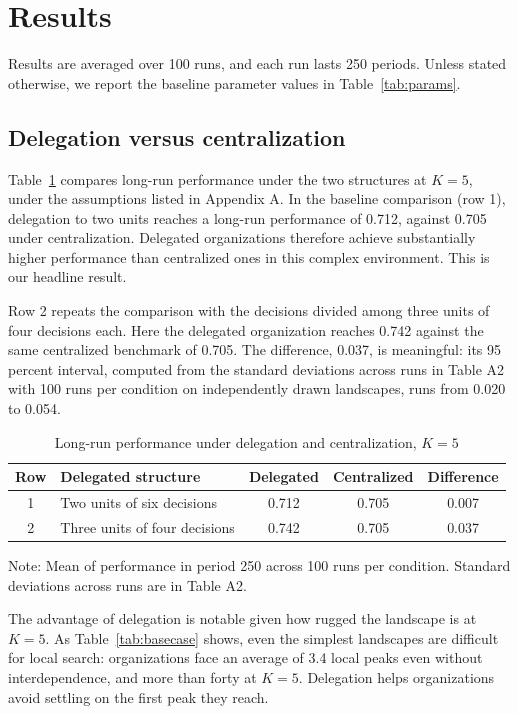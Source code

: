 \documentclass[11pt]{article}
\begin{document}
\section{Results}

Results are averaged over 100 runs, and each run lasts 250 periods. Unless stated otherwise, we report the baseline parameter values in Table~\ref{tab:params}.

\subsection{Delegation versus centralization}

Table~\ref{tab:main} compares long-run performance under the two structures at $K = 5$, under the assumptions listed in Appendix A. In the baseline comparison (row 1), delegation to two units reaches a long-run performance of 0.712, against 0.705 under centralization. Delegated organizations therefore achieve substantially higher performance than centralized ones in this complex environment. This is our headline result.

Row 2 repeats the comparison with the decisions divided among three units of four decisions each. Here the delegated organization reaches 0.742 against the same centralized benchmark of 0.705. The difference, 0.037, is meaningful: its 95 percent interval, computed from the standard deviations across runs in Table A2 with 100 runs per condition on independently drawn landscapes, runs from 0.020 to 0.054.

\begin{table}[h]
\centering
\caption{Long-run performance under delegation and centralization, $K = 5$}
\label{tab:main}
\begin{tabular}{clccc}
\toprule
Row & Delegated structure & Delegated & Centralized & Difference \\
\midrule
1 & Two units of six decisions & 0.712 & 0.705 & 0.007 \\
2 & Three units of four decisions & 0.742 & 0.705 & 0.037 \\
\bottomrule
\end{tabular}

\smallskip
\footnotesize Note: Mean of performance in period 250 across 100 runs per condition. Standard deviations across runs are in Table A2.
\end{table}

The advantage of delegation is notable given how rugged the landscape is at $K = 5$. As Table~\ref{tab:basecase} shows, even the simplest landscapes are difficult for local search: organizations face an average of 3.4 local peaks even without interdependence, and more than forty at $K = 5$. Delegation helps organizations avoid settling on the first peak they reach.
\end{document}
